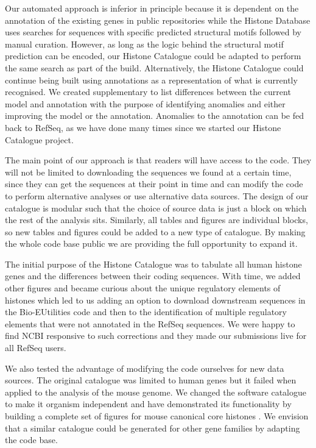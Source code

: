 Our automated
approach is inferior in principle because it is dependent on the
annotation of the existing genes in public repositories
while the Histone Database uses searches for
sequences with specific predicted structural motifs followed by manual
curation.  However, as long
as the logic behind the structural motif prediction can be encoded,
our Histone Catalogue could be adapted to perform the same search as
part of the build.
Alternatively, the Histone Catalogue could continue being built using
annotations as a representation of what is currently
recognised.  We created supplementary  to
list differences between the current model and annotation
with the purpose of identifying anomalies and
either improving the model or the
annotation.
Anomalies to the annotation can be fed back to RefSeq, as we have done
many times since we started our Histone Catalogue project.

The main point of our approach is that readers will have access to the
code.  They will not be limited to downloading the sequences we found
at a certain time, since
they can get the sequences at their point in time and can modify the
code to perform alternative analyses or use alternative data sources.
The design of our catalogue is
modular such that the choice of source data is just a block on
which the rest of the
analysis sits.  Similarly, all tables and figures are individual
blocks, so new tables and figures could be added to a new type of catalogue.
By making the whole code base public we are providing the full opportunity
to expand it.

The initial purpose of the Histone Catalogue
was to tabulate all human histone genes and the differences between
their coding sequences.  With time, we added other figures and became
curious about the unique regulatory elements of histones which
led to us adding an option to download downstream sequences in the
Bio-EUtilities code and then to the identification of multiple regulatory
elements that were not annotated in the RefSeq sequences.  We were
happy to find NCBI responsive to such corrections and they made
our submissions live for all RefSeq users.

We also tested the advantage of modifying the code ourselves for new
data sources.  The original catalogue was limited to human genes but it
failed when applied to the analysis of the mouse genome.  We changed
the software catalogue to make it organism independent and have
demonstrated its functionality by building a complete set of figures
for mouse canonical core histones
.  We envision that a similar catalogue
could be generated for other gene families by adapting the code base.

